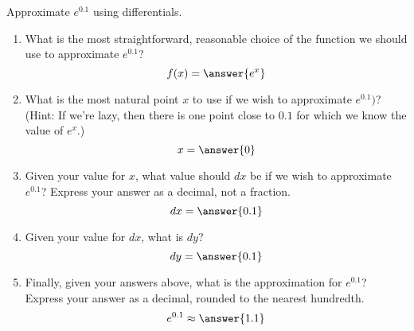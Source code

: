 \documentclass{ximera}
\author{Gregory Hartman \and Matthew Carr}
\begin{document}
\begin{exercise}




Approximate $e^{0.1}$ using differentials.
\begin{enumerate}
\item		What is the most straightforward, reasonable choice of the function we should use to approximate $e^{0.1}$?\[f(x)=\answer{e^{x}}\]
\item		What is the most natural point $x$ to use if we wish to approximate $e^{0.1})$? (Hint: If we're lazy, then there is one point close to $0.1$ for which we know the value of $e^x$.) \[x=\answer{0}\]
\item		Given your value for $x$, what value should $dx$ be if we wish to approximate $e^{0.1}$? Express your answer as a decimal, not a fraction. \[dx=\answer{0.1}\]
\item		Given your value for $dx$, what is $dy$? \[dy=\answer{0.1}\]
\item		Finally, given your answers above, what is the approximation for $e^{0.1}$? Express your answer as a decimal, rounded to the nearest hundredth. \[e^{0.1}\approx\answer{1.1}\]
\end{enumerate}


\end{exercise}
\end{document}
